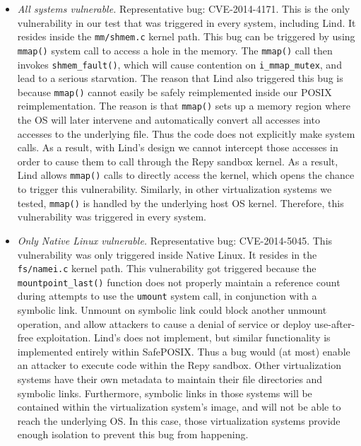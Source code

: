 \begin{itemize}
\item \emph{All systems vulnerable.}  Representative bug: CVE-2014-4171.
This is the only vulnerability in our test that was triggered in every
system, including Lind. It resides inside the \texttt{mm/shmem.c} kernel path. This bug can
be triggered by using \texttt{mmap()} system call to access a hole in the memory.
The \texttt{mmap()} call then invokes \texttt{shmem\_fault()}, which will cause contention
on \texttt{i\_mmap\_mutex}, and lead to a serious starvation.
The reason that Lind also triggered this bug is because \texttt{mmap()} cannot easily
be safely reimplemented inside our POSIX reimplementation.  The reason is
that \texttt{mmap()} sets up a memory region where the OS will later
intervene and automatically convert all accesses into accesses to the
underlying file.  Thus the code does not explicitly make system calls.  As
a result, with Lind's design we cannot intercept those accesses in order
to cause them to call through the Repy sandbox kernel. As a result,
Lind allows \texttt{mmap()} calls to directly access the kernel, which
opens the chance to trigger this vulnerability. Similarly, in other
virtualization systems we tested, \texttt{mmap()} is handled by the underlying
host OS kernel.  
Therefore, this vulnerability was
triggered in every system.

\item \emph{Only Native Linux vulnerable.}  Representative bug: CVE-2014-5045.
This vulnerability was only triggered inside Native Linux. It resides in the
\texttt{fs/namei.c} kernel path. This vulnerability got triggered because
the \texttt{mountpoint\_last()}
function does not properly
maintain a reference count during attempts to use the \texttt{umount} system call,
in conjunction with a symbolic link. Unmount on symbolic link could block another unmount operation,
and allow attackers to cause a denial of service or deploy use-after-free exploitation.
Lind's  does not implement, but similar functionality is implemented entirely
within SafePOSIX.  Thus a bug would (at most) enable an attacker to execute
code within the Repy sandbox.
Other virtualization systems have their own metadata to maintain their file directories and symbolic links. 
Furthermore, symbolic links in those systems will be contained within the virtualization system's image,
and will not be able to reach the underlying OS. In this case, those virtualization systems provide enough
isolation to prevent this bug from happening.


\end{itemize}
